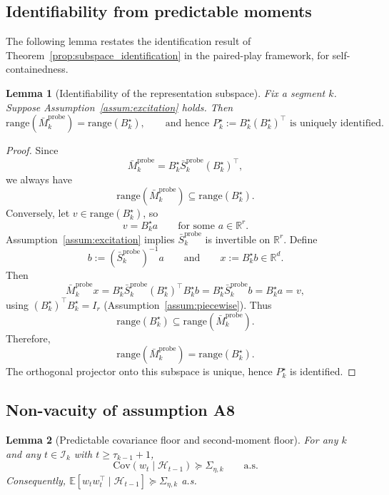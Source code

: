 \documentclass[12pt]{article}
\newcommand{\R}{\mathbb{R}}
\newcommand{\E}{\mathbb{E}}
\newcommand{\cH}{\mathcal{H}}
\newcommand{\cI}{\mathcal{I}}
\newcommand{\range}{\mathrm{range}}
\newtheorem{lemma}{Lemma}
\theoremstyle{plain}
\theoremstyle{definition}
\begin{document}
\subsection{Identifiability from predictable moments}

The following lemma restates the identification result of Theorem~\ref{prop:subspace_identification} in the paired-play framework, for self-containedness.

\begin{lemma}[Identifiability of the representation subspace]
\label{lem:identifiability}
Fix a segment $k$. Suppose Assumption~\ref{assum:excitation} holds. Then
\[
\range(\bar{M}_k^{\mathrm{probe}}) = \range(B_k^\star),
\qquad \text{and hence } P_k^\star := B_k^\star (B_k^\star)^\top \text{ is uniquely identified.}
\]
\end{lemma}

\begin{proof}
Since
\[
\bar{M}_k^{\mathrm{probe}} = B_k^\star \bar{S}_k^{\mathrm{probe}} (B_k^\star)^\top,
\]
we always have
\[
\range(\bar{M}_k^{\mathrm{probe}}) \subseteq \range(B_k^\star).
\]
Conversely, let $v \in \range(B_k^\star)$, so
\[
v = B_k^\star a
\qquad
\text{for some } a \in \R^r.
\]
Assumption~\ref{assum:excitation} implies
$\bar{S}_k^{\mathrm{probe}}$ is invertible on $\R^r$.
Define
\[
b := (\bar{S}_k^{\mathrm{probe}})^{-1} a
\qquad
\text{and}
\qquad
x := B_k^\star b \in \R^d.
\]
Then
\[
\bar{M}_k^{\mathrm{probe}} x
= B_k^\star \bar{S}_k^{\mathrm{probe}} (B_k^\star)^\top B_k^\star b
= B_k^\star \bar{S}_k^{\mathrm{probe}} b
= B_k^\star a
= v,
\]
using $(B_k^\star)^\top B_k^\star = I_r$
(Assumption~\ref{assum:piecewise}).
Thus
\[
\range(B_k^\star) \subseteq \range(\bar{M}_k^{\mathrm{probe}}).
\]
Therefore,
\[
\range(\bar{M}_k^{\mathrm{probe}})=\range(B_k^\star).
\]
The orthogonal projector onto this subspace is unique, hence $P_k^\star$ is identified.
\end{proof}

\subsection{Non-vacuity of assumption A8}

\begin{lemma}[Predictable covariance floor and second-moment floor]
\label{lem:cov_floor}
For any $k$ and any $t \in \cI_k$ with $t \ge \tau_{k-1} + 1$,
\[
\mathrm{Cov}(w_t \mid \cH_{t-1}) \succeq \Sigma_{\eta,k} \qquad \text{a.s.}
\]
Consequently, $\E[w_t w_t^\top \mid \cH_{t-1}] \succeq \Sigma_{\eta,k}$ a.s.
\end{lemma}
\end{document}
